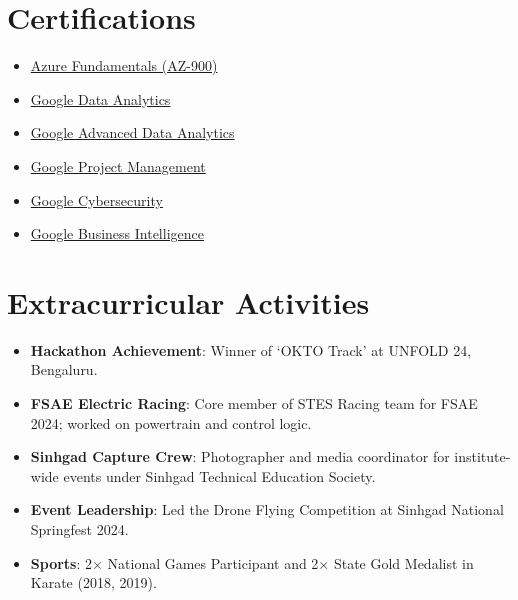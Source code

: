 \documentclass[letterpaper,11pt]{article}
\newcommand{\resumeItem}[2]{\item\small{\textbf{#1}{: #2 \vspace{-2pt}}}}
\newcommand{\resumeSubHeadingListStart}{\begin{itemize}[leftmargin=*]}
\newcommand{\resumeSubHeadingListEnd}{\end{itemize}}
\begin{document}
\section{Certifications}
\vspace{-10pt}
\begin{multicols}{3}
\begin{itemize}[leftmargin=*, itemsep=2pt, parsep=0pt]
  \item \href{https://litzeus.github.io/certificates/Azure_certification.pdf}{Azure Fundamentals (AZ-900)}
  \item \href{https://litzeus.github.io/certificates/google-data-analytics-cert.pdf}{Google Data Analytics}
  \item \href{https://litzeus.github.io/certificates/google-advanced-data-analytics-cert.pdf}{Google Advanced Data Analytics}
  \item \href{https://litzeus.github.io/certificates/google-project-management-cert.pdf}{Google Project Management}
  \item \href{https://litzeus.github.io/certificates/Google%20Cybersecurity%20Professional%20Certificate.pdf}{Google Cybersecurity}
  \item \href{https://litzeus.github.io/certificates/google-business-intelligence-cert.pdf}{Google Business Intelligence}
\end{itemize}
\end{multicols}

\section{Extracurricular Activities}
\resumeSubHeadingListStart
  \resumeItem{Hackathon Achievement}{Winner of ‘OKTO Track’ at UNFOLD 24, Bengaluru.}
  \resumeItem{FSAE Electric Racing}{Core member of STES Racing team for FSAE 2024; worked on powertrain and control logic.}
  \resumeItem{Sinhgad Capture Crew}{Photographer and media coordinator for institute-wide events under Sinhgad Technical Education Society.}
  \resumeItem{Event Leadership}{Led the Drone Flying Competition at Sinhgad National Springfest 2024.}
  \resumeItem{Sports}{2× National Games Participant and 2× State Gold Medalist in Karate (2018, 2019).}
\resumeSubHeadingListEnd
\end{document}
